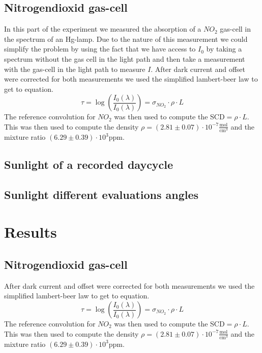 \documentclass[12pt, english]{scrartcl} %
\begin{document}
\begin{multicols}{2}
\subsection{Nitrogendioxid gas-cell}
In this part of the experiment we measured the absorption of a $NO_2$ gas-cell in the spectrum of an Hg-lamp. Due to the nature of this measurement we could simplify the problem by using the fact that we have access to $I_0$ by taking a spectrum without the gas cell in the light path and then take a measurement with the gas-cell in the light path to measure $I$. After dark current and offset were corrected for both measurements we used the simplified lambert-beer law to get to equation.
\begin{equation}
\tau = \log(\frac{I_0(\lambda)}{I_0(\lambda)})= \sigma_{NO_2} \cdot \rho \cdot L
\end{equation}
The reference convolution for $NO_2$ was then used to compute the SCD$= \rho \cdot L$. This was then used to compute the density $\rho = (2.81 \pm 0.07 ) \cdot 10^{-7} \frac{\text{mol}}{\text{cm}^3}$ and the mixture ratio $(6.29 \pm 0.39) \cdot 10^3 \text{ppm}$.
\subsection{Sunlight of a recorded daycycle}

\subsection{Sunlight different evaluations angles}

\section{Results}
\subsection{Nitrogendioxid gas-cell}
After dark current and offset were corrected for both measurements we used the simplified lambert-beer law to get to equation.
\begin{equation}
\tau = \log(\frac{I_0(\lambda)}{I_0(\lambda)})= \sigma_{NO_2} \cdot \rho \cdot L
\end{equation}
The reference convolution for $NO_2$ was then used to compute the SCD$= \rho \cdot L$. This was then used to compute the density $\rho = (2.81 \pm 0.07 ) \cdot 10^{-7} \frac{\text{mol}}{\text{cm}^3}$ and the mixture ratio $(6.29 \pm 0.39) \cdot 10^3 \text{ppm}$.



\end{multicols}
\end{document}
